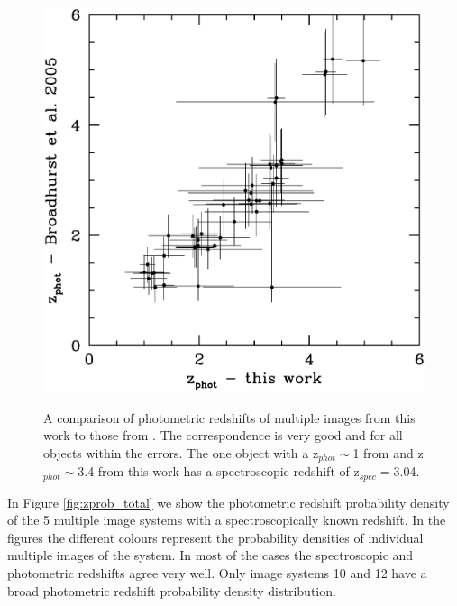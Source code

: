 \documentclass[useAMS,usenatbib]{mn2e}
\newcounter{one}   \setcounter{one}{1}
\begin{document}
\begin{figure}
  \centering
  \includegraphics[width=\columnwidth]{figs/z_phot_comp.ps}\\
  \caption{A comparison of photometric redshifts of multiple images
  from this work to those from \citet{broadhurst:05}. The
  correspondence is very good and for all objects within the
  errors. The one object with a z$_{phot}\sim$1 from
  \citet{broadhurst:05} and z$_{phot}\sim$3.4 from this work has a
  spectroscopic redshift of z$_{spec}=$3.04.}
  \label{fig:zphot_comp}
\end{figure}

In Figure \ref{fig:zprob_total} we show the photometric redshift
probability density of the 5 multiple image systems with a
spectroscopically known redshift. In the figures the different colours
represent the probability densities of individual multiple images of
the system. In most of the cases the spectroscopic and photometric
redshifts agree very well. Only image systems 10 and 12 have a broad
photometric redshift probability density distribution.
\end{document}
